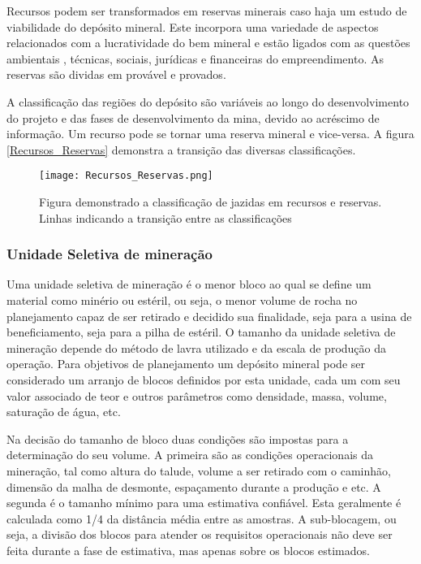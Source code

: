  	
     Recursos podem ser transformados em reservas minerais caso haja um estudo de viabilidade do depósito mineral. Este incorpora uma variedade de aspectos relacionados com a lucratividade do bem mineral e estão ligados com as questões ambientais , técnicas, sociais, jurídicas e financeiras do empreendimento. As reservas são dividas em provável e provados. 
     
     A classificação das regiões do depósito são variáveis ao longo do desenvolvimento do projeto e das fases de desenvolvimento da mina, devido ao acréscimo de informação. Um recurso pode se tornar uma reserva mineral e vice-versa. A figura \eqref{Recursos_Reservas} demonstra a transição das diversas classificações. 

	\begin{figure}[H]
		\centering
		\texttt{[image: Recursos\_Reservas.png]}	
		\caption{Figura demonstrado a classificação de jazidas em recursos e reservas. Linhas indicando a transição entre as classificações }
		\label{Recursos_Reservas}
	\end{figure}
	
	\subsubsection{Unidade Seletiva de mineração}

	Uma unidade seletiva de mineração é o menor bloco ao qual se define um material como minério ou estéril, ou seja, o menor volume de rocha no planejamento capaz de ser retirado e decidido sua finalidade, seja para a usina de beneficiamento, seja para a pilha de estéril. O tamanho da unidade seletiva de mineração depende do método de lavra utilizado e da escala de produção da operação. Para objetivos de planejamento um depósito mineral pode ser considerado um arranjo de blocos definidos por esta unidade, cada um com seu valor associado de teor e outros parâmetros como densidade, massa, volume, saturação de água, etc. 
	
	Na decisão do tamanho de bloco duas condições são impostas para a determinação do seu volume. A primeira são as condições operacionais da mineração, tal como altura do talude, volume a ser retirado com o caminhão, dimensão da malha de desmonte, espaçamento durante a produção e etc. A segunda é o tamanho mínimo para uma estimativa confiável. Esta geralmente é calculada como 1/4 da distância média entre as amostras. A sub-blocagem, ou seja, a divisão dos blocos para atender os requisitos operacionais não deve ser feita durante a fase de estimativa, mas apenas sobre os blocos estimados. 
	
